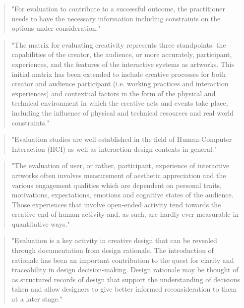\begin{quote}
  "For evaluation to contribute to a successful outcome, the practitioner needs to have the necessary information including constraints on the options under consideration." \citep[p.7]{Candy2012}
\end{quote}

\begin{quote}
  "The matrix for evaluating creativity represents three standpoints: the capabilities of the creator, the audience, or more accurately, participant, experiences, and the features of the interactive systems as artworks. This initial matrix has been extended to include creative processes for both creator and audience participant (i.e. working practices and interaction experiences) and contextual factors in the form of the physical and technical environment in which the creative acts and events take place, including the influence of physical and technical resources and real world constraints." \citep[p.7-8]{Candy2012}
\end{quote}

\begin{quote}
  "Evaluation studies are well established in the field of Human-Computer Interaction (HCI) as well as interaction design contexts in general." \citep[p.8]{Candy2012}
\end{quote}

\begin{quote}
  "The evaluation of user, or rather, participant, experience of interactive artworks often involves measurement of aesthetic appreciation and the various engagement qualities which are dependent on personal traits, motivations, expectations, emotions and cognitive states of the audience. Those experiences that involve open-ended activity tend towards the creative end of human activity and, as such, are hardly ever measurable in quantitative ways."  \citep[p.8]{Candy2012}
\end{quote}

\begin{quote}
  "Evaluation is a key activity in creative design that can be revealed through documentation from design rationale. The introduction of rationale has been an important contribution to the quest for clarity and traceability in design decision-making. Design rationale may be thought of as structured records of design that support the understanding of decisions taken and allow designers to give better informed reconsideration to them at a later stage." \citep[p.9]{Candy2012}
\end{quote}

